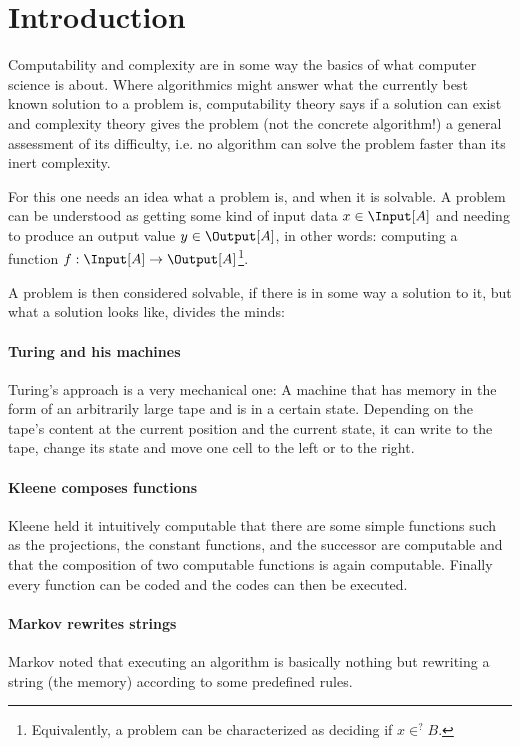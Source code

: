 \section{Introduction}
Computability and complexity are in some way the basics of what computer
science is about. Where algorithmics might answer what the currently best known
solution to a problem is, computability theory says if a solution can exist and
complexity theory gives the problem (not the concrete algorithm!) a general
assessment of its difficulty, i.e. no algorithm can solve the problem faster 
than its inert complexity.

For this one needs an idea what a problem is, and when it is solvable. A 
problem can be understood as getting some kind of input data $x\in \Input[A]$ 
and needing to produce an output value $y\in \Output[A]$, in other words: 
computing a function $f:\Input[A] \rightarrow \Output[A]$\footnote{Equivalently, 
a problem can be characterized as deciding if $x\in^? B$.}.

A problem is then considered solvable, if there is in some way a solution to 
it, but what a solution looks like, divides the minds: 

\paragraph{Turing and his machines}
Turing's approach is a very mechanical one: A machine that has memory in the 
form of an arbitrarily large tape and is in a certain state. Depending on the 
tape's content at the current position and the current state, it can write to 
the tape, change its state and move one cell to the left or to the right.

\paragraph{Kleene composes functions}
Kleene held it intuitively computable that there are some simple functions 
such as the projections, the constant functions, and the successor are 
computable and that the composition of two computable functions is again 
computable. Finally every function can be coded and the codes can then be executed.

\paragraph{Markov rewrites strings}
Markov noted that executing an algorithm is basically nothing but rewriting a 
string (the memory) according to some predefined rules.

